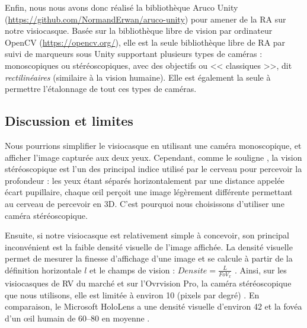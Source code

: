 Enfin, nous nous avons donc réalisé la bibliothèque Aruco Unity (\url{https://github.com/NormandErwan/aruco-unity}) pour amener de la RA sur notre visiocasque. Basée sur la bibliothèque libre de vision par ordinateur OpenCV (\url{https://opencv.org/}), elle est la seule bibliothèque libre de RA par suivi de marqueurs sous Unity supportant plusieurs types de caméras : monoscopiques ou stéréoscopiques, avec des objectifs  ou << classiques >>, dit \emph{rectilinéaires} (similaire à la vision humaine). Elle est également la seule à permettre l'étalonnage de tout ces types de caméras.


\subsection{Discussion et limites}
\label{subsec:solution_discusion}
Nous pourrions simplifier le visiocasque en utilisant une caméra monoscopique, et afficher l'image capturée aux deux yeux. Cependant, comme le souligne \cite{Bourke1999}, la vision stéréoscopique est l'un des principal indice utilisé par le cerveau pour percevoir la profondeur : les yeux étant séparés horizontalement par une distance appelée écart pupillaire, chaque \oe il perçoit une image légèrement différente  permettant au cerveau de percevoir en 3D. C'est pourquoi nous choisissons d'utiliser une caméra stéréoscopique.


Ensuite, si notre visiocasque est relativement simple à concevoir, son principal inconvénient est la faible densité visuelle de l'image affichée. La densité visuelle permet de mesurer la finesse d'affichage d'une image et se calcule à partir de la définition horizontale $l$ et le champs de vision : $Densite = \frac{L}{FoV_x}$ \citep{Boger2017}. Ainsi, sur les visiocasques de RV du marché et sur l'Ovrvision Pro, la caméra stéréoscopique que nous utilisons, elle est limitée à environ \SI{10}{\ppd} (pixels par degré) . En comparaison, le Microsoft HoloLens a une densité visuelle d'environ \SI{42}{\ppd} et la fovéa d'un \oe il humain de \SIrange{60}{80}{\ppd} en moyenne \citep{Kistner2014}.

